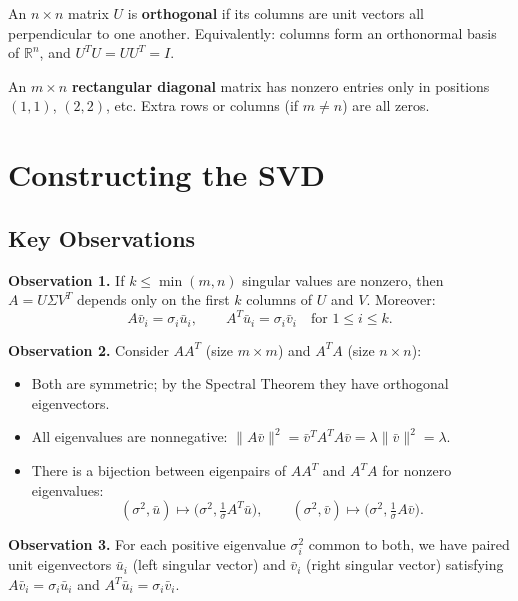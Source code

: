 \begin{definition}
An $n\times n$ matrix $U$ is \textbf{orthogonal} if its columns are unit vectors all perpendicular to one another. Equivalently: columns form an orthonormal basis of $\mathbb{R}^n$, and $U^TU=UU^T=I$.
\end{definition}

\begin{definition}
An $m\times n$ \textbf{rectangular diagonal} matrix has nonzero entries only in positions $(1,1)$, $(2,2)$, etc. Extra rows or columns (if $m\neq n$) are all zeros.
\end{definition}

\section{Constructing the SVD}

\subsection{Key Observations}

\textbf{Observation 1.} If $k\leq\min(m,n)$ singular values are nonzero, then $A=U\Sigma V^T$ depends only on the first $k$ columns of $U$ and $V$. Moreover:
\[
A\bar{v}_i = \sigma_i\bar{u}_i,\qquad A^T\bar{u}_i = \sigma_i\bar{v}_i\quad\text{for }1\leq i\leq k.
\]

\textbf{Observation 2.} Consider $AA^T$ (size $m\times m$) and $A^TA$ (size $n\times n$):
\begin{itemize}
  \item Both are symmetric; by the Spectral Theorem they have orthogonal eigenvectors.
  \item All eigenvalues are nonnegative: $\|A\bar{v}\|^2 = \bar{v}^T A^TA\bar{v} = \lambda\|\bar{v}\|^2 = \lambda$.
  \item There is a bijection between eigenpairs of $AA^T$ and $A^TA$ for nonzero eigenvalues:
  \[
  (\sigma^2,\bar{u})\mapsto \bigl(\sigma^2,\tfrac{1}{\sigma}A^T\bar{u}\bigr),\qquad
  (\sigma^2,\bar{v})\mapsto \bigl(\sigma^2,\tfrac{1}{\sigma}A\bar{v}\bigr).
  \]
\end{itemize}

\textbf{Observation 3.} For each positive eigenvalue $\sigma_i^2$ common to both, we have paired unit eigenvectors $\bar{u}_i$ (left singular vector) and $\bar{v}_i$ (right singular vector) satisfying $A\bar{v}_i=\sigma_i\bar{u}_i$ and $A^T\bar{u}_i=\sigma_i\bar{v}_i$.


